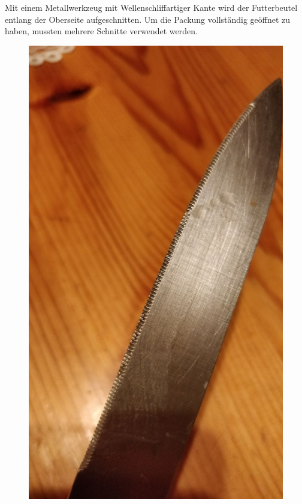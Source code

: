 Mit einem Metallwerkzeug mit Wellenschliffartiger Kante wird der Futterbeutel entlang der Oberseite aufgeschnitten. Um die Packung vollständig geöffnet zu haben, mussten mehrere Schnitte verwendet werden.\\

\begin{figure}[H]
   \begin{minipage}[hbt]{.3\linewidth} %
      \includegraphics[width=\linewidth]{Bilder/Schneideversuch_2.Art/Schneidemittel}

\end{minipage}
\end{figure}
